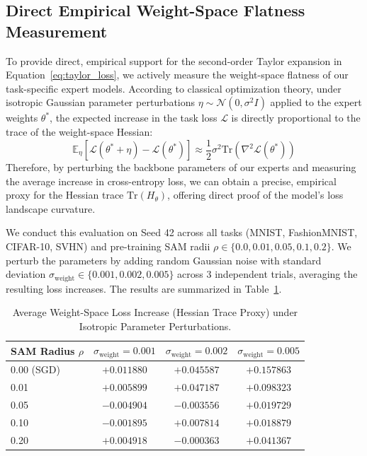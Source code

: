 \subsection{Direct Empirical Weight-Space Flatness Measurement}
\label{sec:exp_weight_flatness}
To provide direct, empirical support for the second-order Taylor expansion in Equation~\ref{eq:taylor_loss}, we actively measure the weight-space flatness of our task-specific expert models. According to classical optimization theory, under isotropic Gaussian parameter perturbations $\eta \sim \mathcal{N}(0, \sigma^2 I)$ applied to the expert weights $\theta^*$, the expected increase in the task loss $\mathcal{L}$ is directly proportional to the trace of the weight-space Hessian:
\begin{equation}
\label{eq:hessian_trace_proxy}
\mathbb{E}_{\eta}\left[ \mathcal{L}(\theta^* + \eta) - \mathcal{L}(\theta^*) \right] \approx \frac{1}{2} \sigma^2 \text{Tr}\left(\nabla^2 \mathcal{L}(\theta^*)\right)
\end{equation}
Therefore, by perturbing the backbone parameters of our experts and measuring the average increase in cross-entropy loss, we can obtain a precise, empirical proxy for the Hessian trace $\text{Tr}(H_{\theta})$, offering direct proof of the model's loss landscape curvature.

We conduct this evaluation on Seed 42 across all tasks (MNIST, FashionMNIST, CIFAR-10, SVHN) and pre-training SAM radii $\rho \in \{0.0, 0.01, 0.05, 0.1, 0.2\}$. We perturb the parameters by adding random Gaussian noise with standard deviation $\sigma_{\text{weight}} \in \{0.001, 0.002, 0.005\}$ across 3 independent trials, averaging the resulting loss increases. The results are summarized in Table~\ref{tab:weight_flatness_results}.

\begin{table}[h]
\caption{Average Weight-Space Loss Increase (Hessian Trace Proxy) under Isotropic Parameter Perturbations.}
\label{tab:weight_flatness_results}
\vskip 0.15in
\centering
\begin{scriptsize}
\begin{sc}
\begin{tabular}{lccc}
\toprule
SAM Radius $\rho$ & $\sigma_{\text{weight}}=0.001$ & $\sigma_{\text{weight}}=0.002$ & $\sigma_{\text{weight}}=0.005$ \\
\midrule
0.00 (SGD)  & $+0.011880$ & $+0.045587$ & $+0.157863$ \\
0.01        & $+0.005899$ & $+0.047187$ & $+0.098323$ \\
0.05        & \textbf{$-0.004904$} & \textbf{$-0.003556$} & \textbf{$+0.019729$} \\
0.10        & $-0.001895$ & $+0.007814$ & $+0.018879$ \\
0.20        & $+0.004918$ & $-0.000363$ & $+0.041367$ \\
\bottomrule
\end{tabular}
\end{sc}
\end{scriptsize}
\vskip -0.1in
\end{table}

